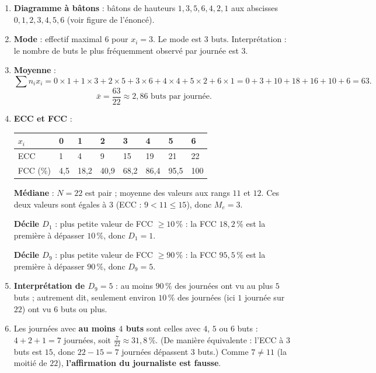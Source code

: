 \documentclass[11pt]{article}
\begin{document}
\begin{corrige}
\begin{enumerate}
    \item \textbf{Diagramme à bâtons} : bâtons de hauteurs $1, 3, 5, 6, 4, 2, 1$ aux abscisses $0, 1, 2, 3, 4, 5, 6$ (voir figure de l'énoncé).
    \item \textbf{Mode} : effectif maximal $6$ pour $x_i=3$. Le mode est $\boxed{3\text{ buts}}$. Interprétation : le nombre de buts le plus fréquemment observé par journée est $3$.
    \item \textbf{Moyenne} :
    \[ \sum n_i x_i = 0\times 1+1\times 3+2\times 5+3\times 6+4\times 4+5\times 2+6\times 1 = 0+3+10+18+16+10+6 = 63. \]
    \[ \bar{x}=\frac{63}{22}\approx \boxed{2{,}86\text{ buts par journée}}. \]
    \item \textbf{ECC et FCC} :
    \begin{center}
    \begin{tabularx}{\linewidth}{|l|X|X|X|X|X|X|X|}
    \hline
    \rowcolor{popblueL}
    $x_i$ & 0 & 1 & 2 & 3 & 4 & 5 & 6 \\
    \hline
    ECC & 1 & 4 & 9 & 15 & 19 & 21 & 22 \\
    \hline
    FCC (\%) & 4,5 & 18,2 & 40,9 & 68,2 & 86,4 & 95,5 & 100 \\
    \hline
    \end{tabularx}
    \end{center}
    \textbf{Médiane} : $N=22$ est pair ; moyenne des valeurs aux rangs $11$ et $12$. Ces deux valeurs sont égales à $3$ (ECC : $9 < 11 \le 15$), donc $\boxed{M_e=3}$.
    
    \textbf{Décile $D_1$} : plus petite valeur de FCC $\ge 10\,\%$ : la FCC $18{,}2\,\%$ est la première à dépasser $10\,\%$, donc $\boxed{D_1=1}$.
    
    \textbf{Décile $D_9$} : plus petite valeur de FCC $\ge 90\,\%$ : la FCC $95{,}5\,\%$ est la première à dépasser $90\,\%$, donc $\boxed{D_9=5}$.
    \item \textbf{Interprétation de $D_9=5$} : au moins $90\,\%$ des journées ont vu au plus $5$ buts ; autrement dit, seulement environ $10\,\%$ des journées (ici $1$ journée sur $22$) ont vu $6$ buts ou plus.
    \item Les journées avec \textbf{au moins $4$ buts} sont celles avec $4$, $5$ ou $6$ buts : $4+2+1=7$ journées, soit $\frac{7}{22}\approx 31{,}8\,\%$. (De manière équivalente : l'ECC à $3$ buts est $15$, donc $22-15=7$ journées dépassent $3$ buts.) Comme $7 \neq 11$ (la moitié de $22$), \textbf{l'affirmation du journaliste est fausse}.
\end{enumerate}


\end{corrige}
\end{document}
